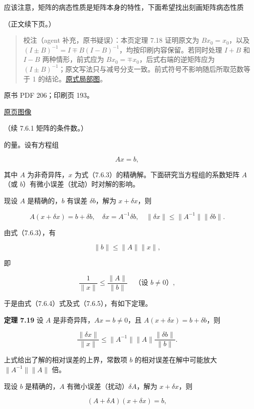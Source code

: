 \documentclass[
  10pt,
  fontset=fandol]{ctexart}
\begin{document}
应该注意，矩阵的病态性质是矩阵本身的特性，下面希望找出刻画矩阵病态性质

（正文续下页。）

\begin{quote}
校注（agent 补充，原书疑误）：本页定理 7.18 证明原文为
\(Bx_0=x_0\)，以及
\((I\pm B)^{-1}=I\mp B(I-B)^{-1}\)，均按印刷内容保留。若同时处理 \(I+B\)
和 \(I-B\) 两种情形，前式应为 \(Bx_0=\mp x_0\)，后式右端的逆矩阵应为
\((I\pm B)^{-1}\)；原文写法只与减号分支一致。前式符号不影响随后所取范数等于
1
的结论。\href{/Users/xiangjunfeng/Desktop/数值计算专用/numerical-analysis/book/staging/ch07b/assets/205-inverse-signs.png}{原式局部图}。
\end{quote}

\clearpage

原书 PDF 206；印刷页 193。

\href{/Users/xiangjunfeng/Desktop/数值计算专用/numerical-analysis/book/source-images/pdf-206.jpeg}{原页图像}

（续 7.6.1 矩阵的条件数。）

的量。设有方程组

\[
Ax=b,
\tag{7.6.3}
\]

其中 \(A\) 为非奇异阵，\(x\)
为式（7.6.3）的精确解。下面研究当方程组的系数矩阵 \(A\)（或
\(b\)）有微小误差（扰动）时对解的影响。

现设 \(A\) 是精确的，\(b\) 有误差 \(\delta b\)，解为 \(x+\delta x\)，则

\[
A(x+\delta x)=b+\delta b,\quad\delta x=A^{-1}\delta b,\quad\|\delta x\|\leqslant\|A^{-1}\|\|\delta b\|.
\tag{7.6.4}
\]

由式（7.6.3），有

\[
\|b\|\leqslant\|A\|\|x\|,
\]

即

\[
\frac1{\|x\|}\leqslant\frac{\|A\|}{\|b\|}\quad\text{（设 }b\neq0\text{）},
\tag{7.6.5}
\]

于是由式（7.6.4）式及式（7.6.5），有如下定理。

\textbf{定理 7.19} 设 \(A\) 是非奇异阵，\(Ax=b\neq0\)，且
\(A(x+\delta x)=b+\delta b\)，则

\[
\frac{\|\delta x\|}{\|x\|}\leqslant\|A^{-1}\|\|A\|\frac{\|\delta b\|}{\|b\|}.
\]

上式给出了解的相对误差的上界，常数项 \(b\) 的相对误差在解中可能放大
\(\|A^{-1}\|\|A\|\) 倍。

现设 \(b\) 是精确的，\(A\) 有微小误差（扰动）\(\delta A\)，解为
\(x+\delta x\)，则

\[
(A+\delta A)(x+\delta x)=b,
\]
\end{document}
